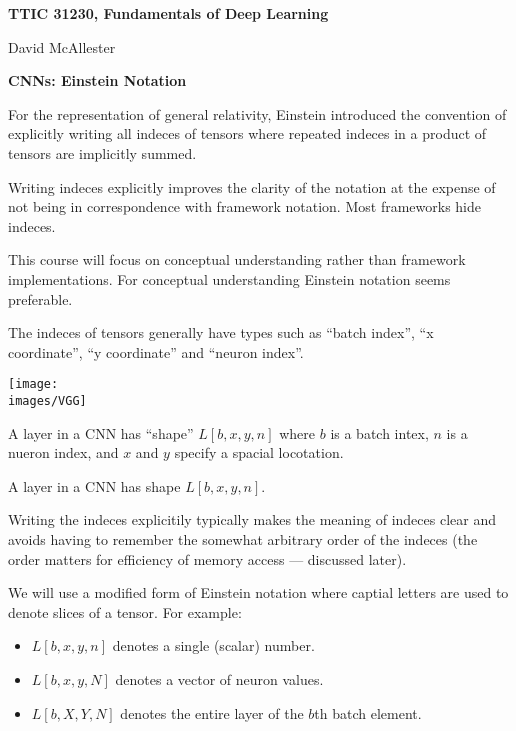 




{\Huge
  
  \centerline{\bf TTIC 31230, Fundamentals of Deep Learning}
  \bigskip
  \centerline{David McAllester}
  \vfill
  \vfill
  \centerline{\bf CNNs: Einstein Notation}
  \vfill
  \vfill
  \vfill



For the representation of general relativity, Einstein introduced the convention of explicitly writing all indeces of tensors where repeated indeces in a product of tensors are implicitly summed.

\vfill
Writing indeces explicitly improves the clarity of the notation at the expense of not being in correspondence with framework notation.  Most frameworks hide indeces.

\vfill
This course will focus on conceptual understanding rather than framework implementations.  For conceptual understanding Einstein notation seems preferable.


The indeces of tensors generally have types such as ``batch index'', ``x coordinate'', ``y coordinate'' and  ``neuron index''.

\vfill
\centerline{\texttt{[image: \\images/VGG]}}

\vfill
A layer in a CNN has ``shape'' $L[b,x,y,n]$ where $b$ is a batch intex, $n$ is a nueron index, and $x$ and $y$ specify a spacial locotation.


A layer in a CNN has shape $L[b,x,y,n]$.

\vfill
Writing the indeces explicitily typically makes the meaning of indeces clear and avoids having to remember the somewhat arbitrary order of the indeces (the order matters for
efficiency of memory access --- discussed later).


\vfill
We will use a modified form of Einstein notation where captial letters are used to denote slices of a tensor.  For example:

\vfill
\begin{itemize}

\item $L[b,x,y,n]$ denotes a single (scalar) number.
\vfill
\item $L[b,x,y,N]$ denotes a vector of neuron values.
\vfill
\item $L[b,X,Y,N]$ denotes the entire layer of the $b$th batch element.
\end{itemize}

}
